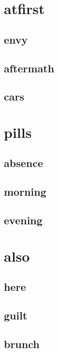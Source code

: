 \documentclass{article}
\begin{document}
\setlength{\parindent}{0.0cm}
\small

\section{atfirst}
\subsection{envy}

\clearpage
\subsection{aftermath}

\clearpage
\subsection{cars}

\clearpage

\section{pills}
\subsection{absence}

\clearpage
\subsection{morning}

\clearpage
\subsection{evening}

\clearpage

\section{also}
\subsection{here}

\clearpage
\subsection{guilt}

\clearpage
\subsection{brunch}

\clearpage
\end{document}
